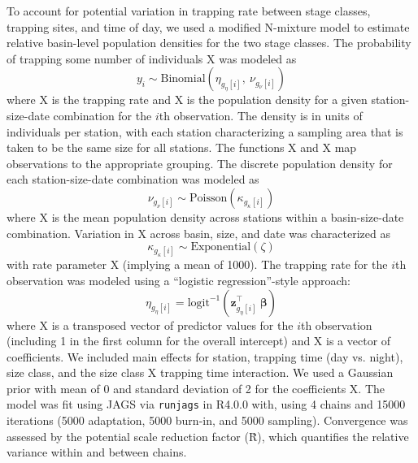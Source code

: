 \documentclass[11pt]{article}
\begin{document}
To account for potential variation in trapping rate between stage classes,
trapping sites, and time of day,
we used a modified N-mixture model to estimate relative basin-level population densities
for the two stage classes.
The probability of trapping some number of individuals X
was modeled as
%
\begin{equation}
  y_i \sim \text{Binomial}\left(\eta_{g_{\eta}[i]}, ~\nu_{g_{\nu}[i]}\right)
\end{equation}
%
where X is the trapping rate
and X is the population density for a given
station-size-date combination for the $i$th observation.
The density is in units of individuals per station,
with each station characterizing a sampling area that is
taken to be the same size for all stations.
The functions X and X map observations to the
appropriate grouping.
The discrete population density for each station-size-date combination was modeled as
%
\begin{equation}
  \nu_{g_{\nu}[i]} \sim \text{Poisson}\left(\kappa_{g_{\kappa}[i]}\right)
\end{equation}
%
where X is the mean population density across stations
within a basin-size-date combination.
Variation in X across basin, size,
and date was characterized as
%
\begin{equation}
  \kappa_{g_{\kappa}[i]} \sim
    \text{Exponential}\left(\zeta \right)
\end{equation}
%
with rate parameter X (implying a mean of 1000).
The trapping rate for the $i$th observation was modeled using a
``logistic regression''-style approach:
%
\begin{equation}
  \eta_{g_{\eta}[i]} =
    \text{logit}^{-1}\left(\mathbf{z}_{g_{\eta}[i]}^\top~{\boldsymbol\beta}\right)
\end{equation}
%
\noindent where X is a transposed vector
of predictor values for the $i$th observation
(including 1 in the first column for the overall intercept)
and X is a vector of coefficients.
We included main effects for station, trapping time (day vs. night), size class,
and the size class X trapping time interaction.
We used a Gaussian prior with mean of 0 and standard deviation of 2
for the coefficients X.
The model was fit using JAGS via \texttt{runjags} in R4.0.0 with,
using 4 chains and 15000 iterations (5000 adaptation, 5000 burn-in, and 5000 sampling).
Convergence was assessed by the potential scale reduction factor (\^{R}),
which quantifies the relative variance within and between chains.
\end{document}

